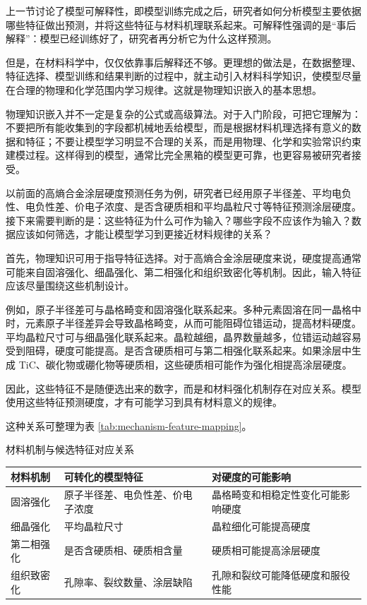 上一节讨论了模型可解释性，即模型训练完成之后，研究者如何分析模型主要依据哪些特征做出预测，并将这些特征与材料机理联系起来。可解释性强调的是“事后解释”：模型已经训练好了，研究者再分析它为什么这样预测。


但是，在材料科学中，仅仅依靠事后解释还不够。更理想的做法是，在数据整理、特征选择、模型训练和结果判断的过程中，就主动引入材料科学知识，使模型尽量在合理的物理和化学范围内学习规律。这就是物理知识嵌入的基本思想。


物理知识嵌入并不一定是复杂的公式或高级算法。对于入门阶段，可把它理解为：不要把所有能收集到的字段都机械地丢给模型，而是根据材料机理选择有意义的数据和特征；不要让模型学习明显不合理的关系，而是用物理、化学和实验常识约束建模过程。这样得到的模型，通常比完全黑箱的模型更可靠，也更容易被研究者接受。


以前面的高熵合金涂层硬度预测任务为例，研究者已经用原子半径差、平均电负性、电负性差、价电子浓度、是否含硬质相和平均晶粒尺寸等特征预测涂层硬度。接下来需要判断的是：这些特征为什么可作为输入？哪些字段不应该作为输入？数据应该如何筛选，才能让模型学习到更接近材料规律的关系？


首先，物理知识可用于指导特征选择。对于高熵合金涂层硬度来说，硬度提高通常可能来自固溶强化、细晶强化、第二相强化和组织致密化等机制。因此，输入特征应该尽量围绕这些机制设计。


例如，原子半径差可与晶格畸变和固溶强化联系起来。多种元素固溶在同一晶格中时，元素原子半径差异会导致晶格畸变，从而可能阻碍位错运动，提高材料硬度。平均晶粒尺寸可与细晶强化联系起来。晶粒越细，晶界数量越多，位错运动越容易受到阻碍，硬度可能提高。是否含硬质相可与第二相强化联系起来。如果涂层中生成 TiC、碳化物或硼化物等硬质相，这些硬质相可能作为强化相提高涂层硬度。


因此，这些特征不是随便选出来的数字，而是和材料强化机制存在对应关系。模型使用这些特征预测硬度，才有可能学习到具有材料意义的规律。


这种关系可整理为表 \ref{tab:mechanism-feature-mapping}。


\begin{formalTable}[htbp]
\caption{材料机制与候选特征对应关系}
\label{tab:mechanism-feature-mapping}
\begin{tabularx}{\textwidth}{@{}YYY@{}}
\toprule
\textbf{材料机制} & \textbf{可转化的模型特征} & \textbf{对硬度的可能影响} \\
\midrule
固溶强化 & 原子半径差、电负性差、价电子浓度 & 晶格畸变和相稳定性变化可能影响硬度 \\
细晶强化 & 平均晶粒尺寸 & 晶粒细化可能提高硬度 \\
第二相强化 & 是否含硬质相、硬质相含量 & 硬质相可能提高涂层硬度 \\
组织致密化 & 孔隙率、裂纹数量、涂层缺陷 & 孔隙和裂纹可能降低硬度和服役性能 \\
\bottomrule
\end{tabularx}
\end{formalTable}

